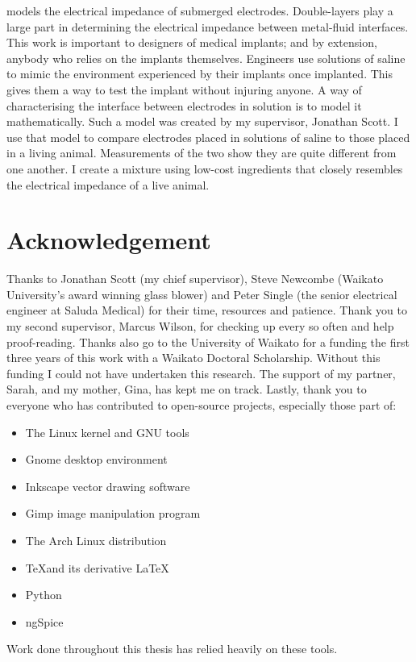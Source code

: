    models the electrical impedance of submerged electrodes.
  Double-layers play a large part in determining the electrical impedance between metal-fluid interfaces.
  This work is important to designers of medical implants; and by extension, anybody who relies on the implants themselves.
  Engineers use solutions of saline to mimic the environment experienced by their implants once implanted.
  This gives them a way to test the implant without injuring anyone.
  A way of characterising the interface between electrodes in solution is to model it mathematically.
  Such a model was created by my supervisor, Jonathan Scott.
  I use that model to compare electrodes placed in solutions of saline to those placed in a living animal.
  Measurements of the two show they are quite different from one another.
  I create a mixture using low-cost ingredients that closely resembles the electrical impedance of a live animal.


\chapter*{Acknowledgement}
Thanks to Jonathan Scott (my chief supervisor), Steve Newcombe (Waikato University's award winning glass blower) and Peter Single (the senior electrical engineer at Saluda Medical) for their time, resources and patience.
Thank you to my second supervisor, Marcus Wilson, for checking up every so often and help proof-reading.
Thanks also go to the University of Waikato for a funding the first three years of this work with a Waikato Doctoral Scholarship.
Without this funding I could not have undertaken this research.
The support of my partner, Sarah, and my mother, Gina, has kept me on track.
Lastly, thank you to everyone who has contributed to open-source projects, especially those part of:
\begin{itemize}
\item The Linux kernel and GNU tools
\item Gnome desktop environment
\item Inkscape vector drawing software
\item Gimp image manipulation program
\item The Arch Linux distribution
\item \TeX \space and its derivative \LaTeX
\item Python
\item ngSpice
\end{itemize}
Work done throughout this thesis has relied heavily on these tools.

